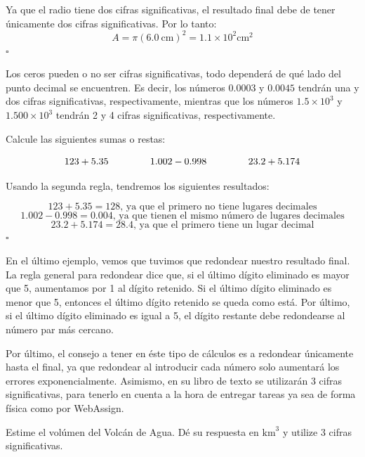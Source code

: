 \begin{solution*}
Ya que el radio tiene dos cifras significativas, el resultado final debe de tener \'unicamente dos cifras significativas. Por lo tanto:
\[ A = \pi (\SI{6.0}{\centi\meter})^2 = 1.1\times10^2\si{\centi\meter}^2\]
\hfill $\square$
\end{solution*}

Los ceros pueden o no ser cifras significativas, todo depender\'a de qu\'e lado del punto decimal se encuentren. Es decir, los n\'umeros $0.0003$ y $0.0045$ tendr\'an una y dos cifras significativas, respectivamente, mientras que los n\'umeros $1.5\times10^3$ y $1.500\times10^3$ tendr\'an 2 y 4 cifras significativas, respectivamente. 

\begin{ejemplo}
Calcule las siguientes sumas o restas:

\[ 123+5.35 \hspace{15mm} 1.002-0.998 \hspace{15mm} 23.2 + 5.174\]

\end{ejemplo}

\begin{solution*}
Usando la segunda regla, tendremos los siguientes resultados:

\[ 
123+5.35 = 128 \text{, ya que el primero no tiene lugares decimales}\]
\[
1.002-0.998 = 0.004 \text{, ya que tienen el mismo n\'umero de lugares decimales}\]
\[
23.2+5.174 = 28.4 \text{, ya que el primero tiene un lugar decimal}
\]
\hfill $\square$
\end{solution*}

En el \'ultimo ejemplo, vemos que tuvimos que redondear nuestro resultado final. La regla general para redondear dice que, si el \'ultimo d\'igito eliminado es mayor que 5, aumentamos por 1 al d\'igito retenido. Si el \'ultimo d\'igito eliminado es menor que 5, entonces el \'ultimo d\'igito retenido se queda como est\'a. Por \'ultimo, si el \'ultimo d\'igito eliminado es igual a 5, el d\'igito restante debe redondearse al n\'umero par m\'as cercano.

Por \'ultimo, el consejo a tener en \'este tipo de c\'alculos es a redondear \'unicamente hasta el final, ya que redondear al introducir cada n\'umero solo aumentar\'a los errores exponencialmente. Asimismo, en su libro de texto se utilizar\'an 3 cifras significativas, para tenerlo en cuenta a la hora de entregar tareas ya sea de forma f\'isica como por WebAssign.

\begin{ejercicio}
Estime el vol\'umen del Volc\'an de Agua. D\'e su respuesta en $\si{\kilo\meter}^{3}$ y utilize 3 cifras significativas.
\end{ejercicio}
